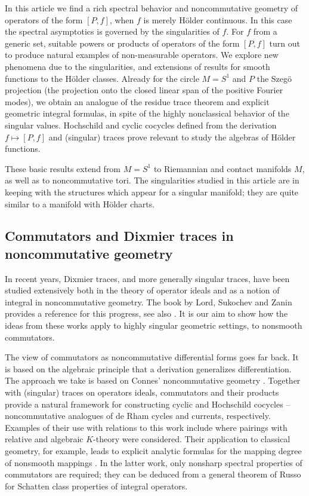 \documentclass[10pt]{amsart}
\theoremstyle{remark}
\theoremstyle{definition}
\begin{document}
In this article we find a rich spectral behavior and noncommutative geometry of operators of the form $[P,f]$, when $f$ is merely H\"{o}lder continuous.  In this case the spectral asymptotics is governed by the singularities of $f$. For $f$ from a generic set, suitable powers or products of operators of the form $[P,f]$ turn out to produce natural examples of non-measurable operators. We explore new phenomena due to the singularities, and extensions of results for smooth functions to the H\"{o}lder classes. Already for the circle $M = S^1$ and $P$ the Szeg\"{o} projection (the projection onto the closed linear span of the positive Fourier modes), we obtain an analogue of the residue trace theorem and explicit geometric integral formulas, in spite of the highly nonclassical behavior of the singular values. Hochschild and cyclic cocycles defined from the derivation $f\mapsto [P,f]$ and (singular) traces prove relevant to study the algebras of  H\"{o}lder functions.

These basic results extend from $M=S^1$ to Riemannian and contact manifolds $M$, as well as to noncommutative tori. The singularities studied in this article are in keeping with the structures which appear for a singular manifold; they are quite similar to a manifold with H\"{o}lder charts.

\subsection{Commutators and Dixmier traces in noncommutative geometry}

In recent years, Dixmier traces, and more generally singular traces, have been studied extensively both in the theory of operator ideals and as a notion of integral in noncommutative geometry. The book by Lord, Sukochev and Zanin \cite{sukolord} provides a reference for this  progress, see also \cite{kaloposu, pietsch, pietschtwo,lidskiitypesesuza,dixmieragain}. It is our aim to show how the ideas from these works apply to highly singular geometric settings, to nonsmooth commutators.

The view of commutators as noncommutative differential forms goes far back. It is based on the algebraic principle that a derivation generalizes differentiation. The approach we take is based on Connes' noncommutative geometry \cite[Chapter III]{c}. Together with (singular) traces on operators ideals, commutators and their products provide a natural framework for constructing cyclic and Hochschild cocycles -- noncommutative analogues of de Rham cycles and currents, respectively. Examples of their use with relations to this work include \cite{conneskaroubi,kaadcomparison} where pairings with relative and algebraic $K$-theory were considered. Their application to classical geometry, for example, leads to explicit analytic formulas for the mapping degree of nonsmooth mappings \cite{goffodd}. In the latter work, only nonsharp spectral properties of commutators are required; they can be deduced from a general theorem of Russo \cite{russo} for Schatten class properties of integral operators.
\end{document}
